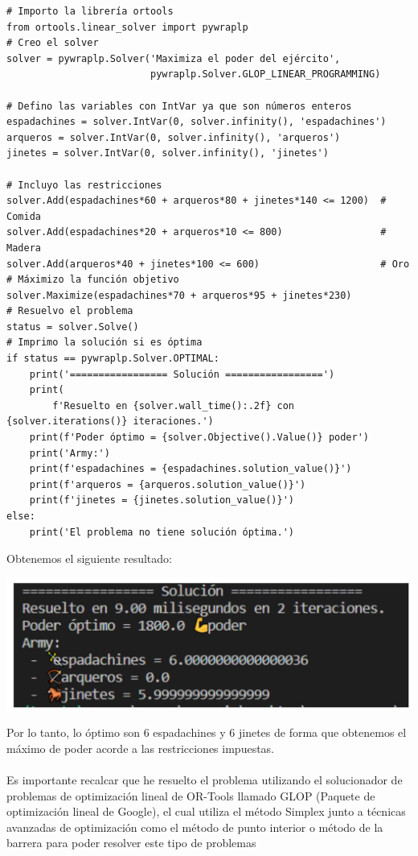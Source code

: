 \documentclass[10pt]{article}
\begin{document}
\begin{verbatim}
# Importo la librería ortools
from ortools.linear_solver import pywraplp
# Creo el solver
solver = pywraplp.Solver('Maximiza el poder del ejército',
                         pywraplp.Solver.GLOP_LINEAR_PROGRAMMING)

# Defino las variables con IntVar ya que son números enteros
espadachines = solver.IntVar(0, solver.infinity(), 'espadachines')
arqueros = solver.IntVar(0, solver.infinity(), 'arqueros')
jinetes = solver.IntVar(0, solver.infinity(), 'jinetes')

# Incluyo las restricciones
solver.Add(espadachines*60 + arqueros*80 + jinetes*140 <= 1200)  # Comida
solver.Add(espadachines*20 + arqueros*10 <= 800)                 # Madera
solver.Add(arqueros*40 + jinetes*100 <= 600)                     # Oro
# Máximizo la función objetivo
solver.Maximize(espadachines*70 + arqueros*95 + jinetes*230)
# Resuelvo el problema
status = solver.Solve()
# Imprimo la solución si es óptima
if status == pywraplp.Solver.OPTIMAL:
    print('================= Solución =================')
    print(
        f'Resuelto en {solver.wall_time():.2f} con {solver.iterations()} iteraciones.')
    print(f'Poder óptimo = {solver.Objective().Value()} poder')
    print('Army:')
    print(f'espadachines = {espadachines.solution_value()}')
    print(f'arqueros = {arqueros.solution_value()}')
    print(f'jinetes = {jinetes.solution_value()}')
else:
    print('El problema no tiene solución óptima.')
\end{verbatim}
Obtenemos el siguiente resultado:

\begin{center}
\includegraphics[max width=\textwidth]{images/solucion.jpg}
\end{center}

Por lo tanto, lo óptimo son 6 espadachines y 6 jinetes de forma que obtenemos el máximo de poder acorde a las restricciones impuestas.\\
\\
Es importante recalcar que he resuelto el problema utilizando el solucionador de problemas de optimización lineal de OR-Tools llamado GLOP (Paquete de optimización lineal de Google), el cual utiliza el método Simplex junto a técnicas avanzadas de optimización como el método de punto interior o método de la barrera para poder resolver este tipo de problemas
\end{document}
